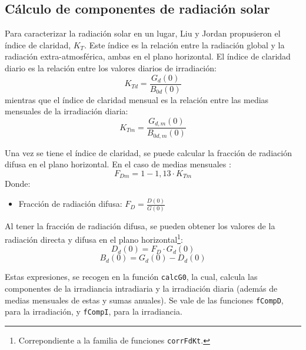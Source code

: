 \subsection{Cálculo de componentes de radiación solar}
\label{sec:org07b63cc}
\label{subsec:calculo-componentes-radiacion-solar}
Para caracterizar la radiación solar en un lugar, Liu y Jordan \cite{Liu.Jordan1960} propusieron el índice de claridad, \(K_T\). Este índice es la relación entre la radiación global y la radiación extra-atmosférica, ambas en el plano horizontal. El índice de claridad diario es la relación entre los valores diarios de irradiación: 
\begin{equation}
K_{Td}=\frac{G_d(0)}{B_{0d}(0)}
\label{eq:ind-cla-dia}
\end{equation}
mientras que el índice de claridad mensual es la relación entre las medias mensuales de la irradiación diaria:
\begin{equation}
K_{Tm}=\frac{G_{d,m}(0)}{B_{0d,m}(0)}
\label{eq:ind-cla-men}
\end{equation}

Una vez se tiene el índice de claridad, se puede calcular la fracción de radiación difusa en el plano horizontal. En el caso de medias mensuales \cite{Page1961}:
\begin{equation}
F_{Dm}=1-1,13\cdot K_{Tm}
\end{equation}
Donde:
\begin{itemize}
\item Fracción de radiación difusa: \(F_D=\frac{D(0)}{G(0)}\) 
 
\end{itemize}
Al tener la fracción de radiación difusa, se pueden obtener los valores de la radiación directa y difusa en el plano horizontal\footnote{Correpondiente a la familia de funciones \texttt{corrFdKt}.}:
\begin{equation}
D_d(0)=F_D\cdot G_d(0)
\label{dif-rad}
\end{equation}
\begin{equation}
B_d(0)=G_d(0)-D_d(0)
\label{dir-rad}
\end{equation}

Estas expresiones, se recogen en la función \texttt{calcG0}, la cual, calcula las componentes de la irradiancia intradiaria y la irradiación diaria (además de medias mensuales de estas y sumas anuales). Se vale de las funciones \texttt{fCompD}, para la irradiación, y \texttt{fCompI}, para la irradiancia. 

